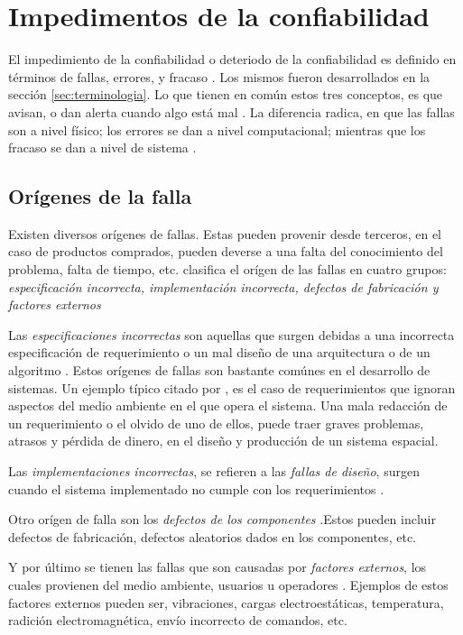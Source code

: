 \section{Impedimentos de la confiabilidad}
El impedimiento de la confiabilidad o deteriodo de la confiabilidad es definido en términos de 
fallas, errores, y fracaso \citep{FTDesign}. Los mismos fueron desarrollados en la sección 
\ref{sec:terminologia}. Lo que tienen en común estos tres conceptos, es que avisan, o dan alerta 
cuando algo está mal \citep{FTDesign}. La diferencia radica, en que las fallas son a nivel físico; 
los errores se dan a nivel computacional; mientras que los fracaso se dan a nivel de sistema 
\cite{FTDesign}.

\subsection{Orígenes de la falla}
Existen diversos orígenes de fallas. Estas pueden provenir desde terceros, en el caso de productos 
comprados, pueden deverse a una falta del conocimiento del problema, falta de tiempo, etc. 
\cite{FTDesign} clasifica el orígen de las fallas en cuatro grupos: \textit{especificación 
incorrecta, implementación incorrecta, defectos de fabricación y factores externos}

Las \textit{especificaciones incorrectas} son aquellas que surgen debidas a una incorrecta 
especificación de requerimiento o un mal diseño de una arquitectura o de un algoritmo 
\citep{FTDesign}. Estos orígenes de fallas son bastante comúnes en el desarrollo de sistemas. Un
ejemplo típico citado por \cite{FTDesign}, es el caso de requerimientos que ignoran aspectos del 
medio ambiente en el que opera el sistema. Una mala redacción de un requerimiento o el olvido de 
uno de ellos, puede traer graves problemas, atrasos y pérdida de dinero,  en el diseño y producción 
de un sistema espacial. 

Las \textit{implementaciones incorrectas}, se refieren a las \textit{fallas de diseño}, surgen 
cuando el sistema implementado no cumple con los requerimientos \citep{FTDesign}.

Otro orígen de falla son los \textit{defectos de los componentes} \citep{FTDesign}.Estos pueden 
incluir defectos de fabricación, defectos aleatorios dados en los componentes, etc.

Y por último se tienen las fallas que son causadas por \textit{factores externos}, los cuales 
provienen del medio ambiente, usuarios u operadores \citep{FTDesign}. Ejemplos de estos factores 
externos pueden ser, vibraciones, cargas electroestáticas, temperatura, radición electromagnética, 
envío incorrecto de comandos, etc.

